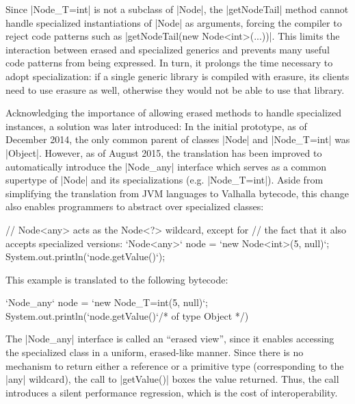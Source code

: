 Since |Node_{T=int}| is not a subclass of |Node|, the |getNodeTail| method cannot handle specialized instantiations of |Node| as arguments, forcing the compiler to reject code patterns such as |getNodeTail(new Node<int>(...))|.
This limits the interaction between erased and specialized generics and prevents many useful code patterns from being expressed. In turn, it prolongs the time necessary to adopt specialization: if a single generic library is compiled with erasure, its clients need to use erasure as well, otherwise they would not be able to use that library.

Acknowledging the importance of allowing erased methods to handle specialized instances, a solution was later introduced: In the initial prototype, as of December 2014, the only common parent of classes |Node| and |Node_{T=int}| was |Object|. However, as of August 2015, the translation has been improved to automatically introduce the |Node_any| interface which serves as a common supertype of |Node| and its specializations (e.g. |Node_{T=int}|). Aside from simplifying the translation from JVM languages to Valhalla bytecode, this change also enables programmers to abstract over specialized classes:

\begin{lstlisting-nobreak}
// Node<any> acts as the Node<?> wildcard, except for
// the fact that it also accepts specialized versions:
`Node<any>` node = `new Node<int>(5, null)`;
System.out.println(`node.getValue()`);
\end{lstlisting-nobreak}

This example is translated to the following bytecode:

\begin{lstlisting-nobreak}
`Node_any` node = `new Node_{T=int}(5, null)`;
System.out.println(`node.getValue()`/* of type Object */)
\end{lstlisting-nobreak}

The |Node_any| interface is called an ``erased view'', since it enables accessing the specialized class in a uniform, erased-like manner. Since there is no mechanism to return either a reference or a primitive type (corresponding to the |any| wildcard), the call to |getValue()| boxes the value returned. Thus, the call introduces a silent performance regression, which is the cost of interoperability.

